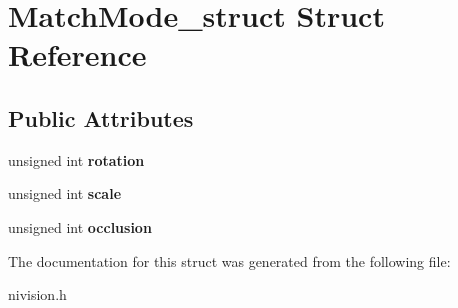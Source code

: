 \hypertarget{structMatchMode__struct}{
\section{MatchMode\_\-struct Struct Reference}
\label{structMatchMode__struct}
}
\subsection*{Public Attributes}
\begin{DoxyCompactItemize}
\item 
\hypertarget{structMatchMode__struct_a86903777e34f6c295253bf916ee8c5e7}{
unsigned int {\bfseries rotation}}
\label{structMatchMode__struct_a86903777e34f6c295253bf916ee8c5e7}

\item 
\hypertarget{structMatchMode__struct_a392ccfb4a4a8190d7a13254a84280179}{
unsigned int {\bfseries scale}}
\label{structMatchMode__struct_a392ccfb4a4a8190d7a13254a84280179}

\item 
\hypertarget{structMatchMode__struct_abf1b6a238f98bb373029417eab2cb976}{
unsigned int {\bfseries occlusion}}
\label{structMatchMode__struct_abf1b6a238f98bb373029417eab2cb976}

\end{DoxyCompactItemize}


The documentation for this struct was generated from the following file:\begin{DoxyCompactItemize}
\item 
nivision.h\end{DoxyCompactItemize}
